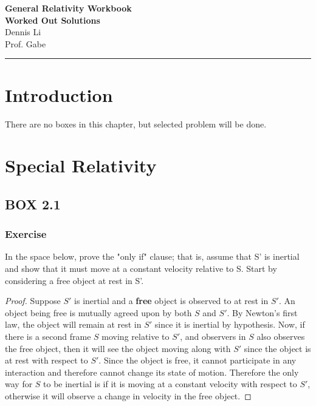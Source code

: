 \documentclass[12pt]{memoir}
\newif\ifshow
\begin{document}
\begin{center}
\ifshow
  \textbf{\Large GRW Workbook}\\
\else
  \textbf{\Large General Relativity Workbook\\Worked Out Solutions}\\
\fi
Dennis Li\\Prof. Gabe\\
\end{center}

\hrule

\vspace{0.2cm}
\begingroup
\let\clearpage\relax
\chapter{Introduction}
\endgroup
There are no boxes in this chapter, but selected problem will be done.

\begingroup
\let\clearpage\relax
\chapter{Special Relativity}
\endgroup
\section{BOX 2.1}
\subsection{Exercise}
In the space below, prove the "only if" clause; that is, assume that S' is inertial and show that it must move at a constant velocity relative to S. Start by considering a free object at rest in S'.

\begin{proof}
    Suppose $S'$ is inertial and a \textbf{free} object is observed to at rest in $S'$. An object being free is mutually agreed upon by both $S$ and $S'$. By Newton's first law, the object will remain at rest in $S'$ since it is inertial by hypothesis. Now, if there is a second frame $S$ moving relative to $S'$, and observers in $S$ also observes the free object, then it will see the object moving along with $S'$ since the object is at rest with respect to $S'$. Since the object is free, it cannot participate in any interaction and therefore cannot change its state of motion. Therefore the only way for $S$ to be inertial is if it is moving at a constant velocity with respect to $S'$, otherwise it will observe a change in velocity in the free object.  
\end{proof}
\end{document}
